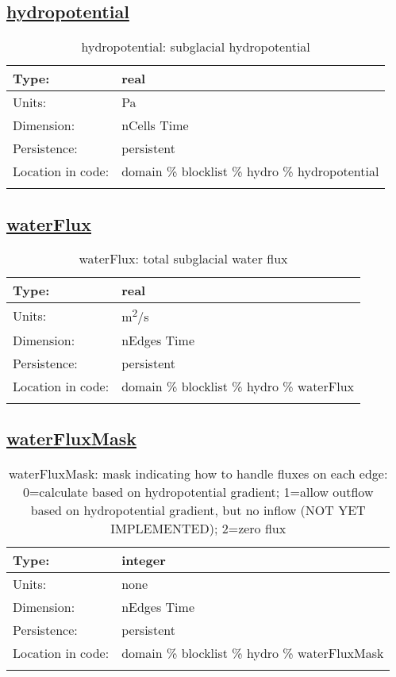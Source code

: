 \subsection[hydropotential]{\hyperref[sec:var_tab_hydro]{hydropotential}}
\label{subsec:var_sec_hydro_hydropotential}
\begin{center}
\begin{longtable}{| p{2.0in} | p{4.0in} |}
        \hline 
        Type: & real \\
        \hline 
        Units: & \si{Pa} \\
        \hline 
        Dimension: & nCells Time \\
        \hline 
        Persistence: & persistent \\
        \hline 
         Location in code: & domain \% blocklist \% hydro \% hydropotential \\
         \hline 
    \caption{hydropotential: subglacial hydropotential}
\end{longtable}
\end{center}
\subsection[waterFlux]{\hyperref[sec:var_tab_hydro]{waterFlux}}
\label{subsec:var_sec_hydro_waterFlux}
\begin{center}
\begin{longtable}{| p{2.0in} | p{4.0in} |}
        \hline 
        Type: & real \\
        \hline 
        Units: & \si{m^2/s} \\
        \hline 
        Dimension: & nEdges Time \\
        \hline 
        Persistence: & persistent \\
        \hline 
         Location in code: & domain \% blocklist \% hydro \% waterFlux \\
         \hline 
    \caption{waterFlux: total subglacial water flux}
\end{longtable}
\end{center}
\subsection[waterFluxMask]{\hyperref[sec:var_tab_hydro]{waterFluxMask}}
\label{subsec:var_sec_hydro_waterFluxMask}
\begin{center}
\begin{longtable}{| p{2.0in} | p{4.0in} |}
        \hline 
        Type: & integer \\
        \hline 
        Units: & \si{none} \\
        \hline 
        Dimension: & nEdges Time \\
        \hline 
        Persistence: & persistent \\
        \hline 
         Location in code: & domain \% blocklist \% hydro \% waterFluxMask \\
         \hline 
    \caption{waterFluxMask: mask indicating how to handle fluxes on each edge: 0=calculate based on hydropotential gradient; 1=allow outflow based on hydropotential gradient, but no inflow (NOT YET IMPLEMENTED); 2=zero flux}
\end{longtable}
\end{center}
